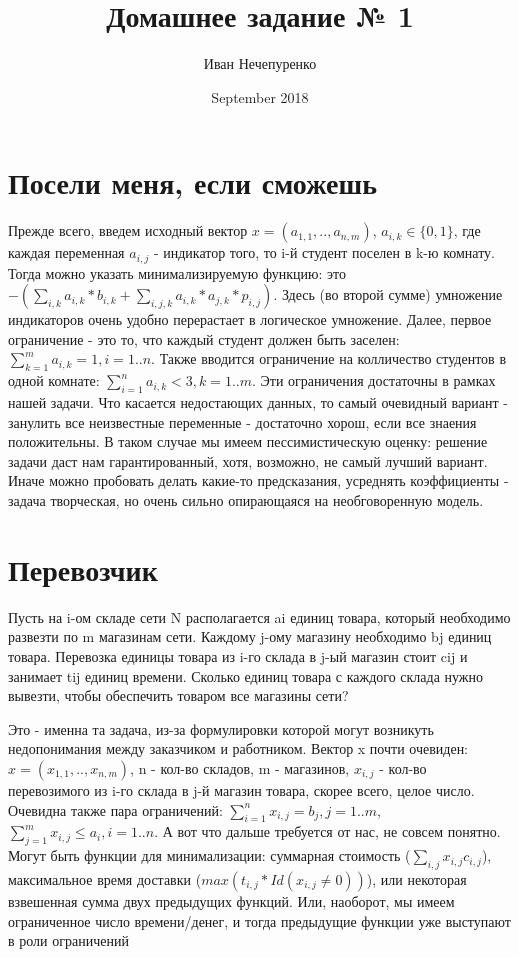 \documentclass{article}
\title{Домашнее задание № 1}
\author{Иван Нечепуренко }
\date{September 2018}
\begin{document}
\maketitle

\section{Посели меня, если сможешь}
Прежде всего, введем исходный вектор 
$x = (a_{1,1}, .. , a_{n, m})$, $a_{i, k} \in  \{0, 1\} $, где каждая переменная
$a_{i, j} $ - индикатор того, то i-й студент поселен в k-ю комнату. Тогда можно 
указать минимализируемую функцию: это $-(\sum\limits_{i, k}a_{i, k}*b_{i, k} + \sum\limits_{i, j, k}a_{i, k}*a_{j, k}*p_{i, j})$. Здесь (во второй сумме) умножение индикаторов очень удобно перерастает в логическое умножение. Далее, первое ограничение - это то, что каждый студент должен быть заселен:
$\sum\limits_{k = 1}^{m}a_{i, k} = 1, i = 1 .. n$. Также вводится ограничение на 
колличество студентов в одной комнате: $\sum\limits_{i = 1}^{n}a_{i, k} < 3, k = 1 .. m$. Эти ограничения достаточны в рамках нашей задачи. Что касается недостающих 
данных, то самый очевидный вариант - занулить все неизвестные переменные - достаточно хорош, если все знаения положительны. В таком случае мы имеем пессимистическую оценку: решение задачи даст нам гарантированный, хотя, возможно, не
самый лучший вариант. Иначе можно пробовать делать какие-то предсказания, усреднять
коэффициенты - задача творческая, но очень сильно опирающаяся на необговоренную модель.

\section{Перевозчик}

 Пусть на i-ом складе сети N располагается ai единиц товара, который необходимо развезти по m магазинам сети. Каждому j-ому магазину необходимо bj единиц товара. Перевозка единицы товара из i-го склада в j-ый магазин стоит cij и занимает tij единиц времени. Сколько единиц товара с каждого склада нужно вывезти, чтобы обеспечить товаром все
магазины сети?

Это - именна та задача, из-за формулировки которой могут возникуть недопонимания
между заказчиком и работником. Вектор x почти очевиден:
$x = (x_{1,1}, .. , x_{n, m})$, n - кол-во складов, m - магазинов, $x_{i, j}$ - кол-во перевозимого из i-го склада в j-й магазин товара, скорее всего, целое число. Очевидна также пара ограничений:
$\sum\limits_{i = 1}^{n}x_{i, j} = b_j, j = 1 .. m$, 
$\sum\limits_{j = 1}^{m}x_{i, j} \leq a_i, i = 1 .. n$. А вот что дальше требуется от нас, не совсем понятно. Могут быть функции для минимализации: 
суммарная стоимость ($\sum\limits_{i, j}x_{i, j}c_{i, j} $), максимальное 
время доставки ($ max(t_{i, j}*Id(x_{i,j} \neq 0))$), или некоторая взвешенная сумма двух предыдущих функций. Или, наоборот, мы имеем ограниченное число времени/денег,
и тогда предыдущие функции уже выступают в роли ограничений
\end{document}
